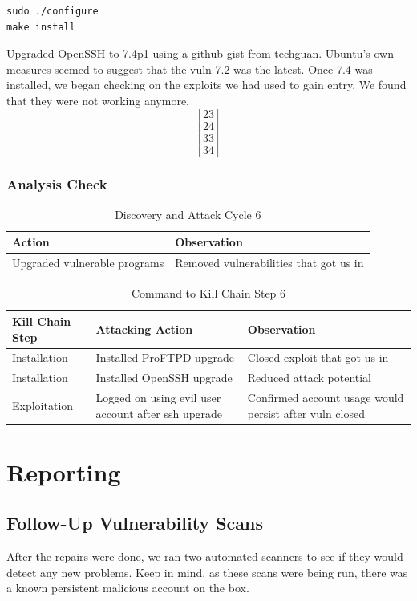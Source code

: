 \begin{lstlisting}
sudo ./configure 
make install
\end{lstlisting}


Upgraded OpenSSH to 7.4p1 using a github gist from techguan.  Ubuntu's own measures seemed to suggest that the vuln 7.2 was the latest.  Once 7.4 was installed, we began checking on the exploits we had used to gain entry. We found that they were not working anymore. \[[23]\] \[[24]\] \[[33]\] \[[34]\]




\subsubsection{Analysis Check}
\begin{table}[H]
\caption{Discovery and Attack Cycle 6}
\centering
\begin{tabular}{|l|l|}
\hline
Action & Observation \\
\hline
Upgraded vulnerable programs & Removed vulnerabilities that got us in \\
\hline
\end{tabular}
\end{table}

\begin{table}[H]
\caption{Command to Kill Chain Step 6}
\centering
\begin{tabular}{|l|l|l|}
\hline
Kill Chain Step & Attacking Action & Observation \\
\hline
Installation & Installed ProFTPD upgrade & Closed exploit\index{exploit} that got us in \\
Installation & Installed OpenSSH upgrade & Reduced \gls{attack} potential \\
Exploitation & Logged on using evil user account after ssh upgrade & Confirmed account usage would persist after vuln closed \\
\hline
\end{tabular}
\end{table}

\section{Reporting}

\subsection{Follow-Up Vulnerability Scans}
After the repairs were done, we ran two automated scanners to see if they would detect any new problems.  Keep in mind, as these scans were being run, there was a known persistent malicious account on the box.  

